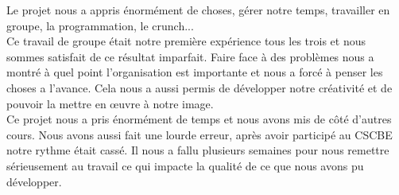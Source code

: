 \documentclass[../main.tex]{subfiles}
\begin{document}
Le projet nous a appris énormément de choses, gérer notre temps, travailler en groupe, la programmation, le crunch... \\
Ce travail de groupe était notre première expérience tous les trois et nous sommes satisfait de ce résultat imparfait. Faire face à des problèmes nous a montré à quel point l’organisation est importante et nous a forcé à penser les choses a l’avance.
Cela nous a aussi permis de développer notre créativité et de pouvoir la mettre en œuvre à notre image. \\

Ce projet nous a pris énormément de temps et nous avons mis de côté d’autres cours. Nous avons aussi fait une lourde erreur, après avoir participé au CSCBE notre rythme était cassé. Il nous a fallu plusieurs semaines pour nous remettre sérieusement au travail ce qui impacte la qualité de ce que nous avons pu développer.

\newpage
\end{document}
